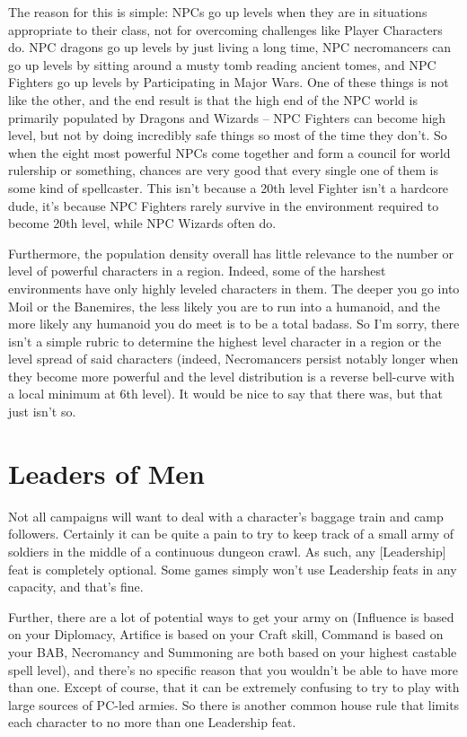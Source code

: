 The reason for this is simple: NPCs go up levels when they are in situations appropriate to their class, not for overcoming challenges like Player Characters do. NPC dragons go up levels by just living a long time, NPC necromancers can go up levels by sitting around a musty tomb reading ancient tomes, and NPC Fighters go up levels by Participating in Major Wars. One of these things is not like the other, and the end result is that the high end of the NPC world is primarily populated by Dragons and Wizards -- NPC Fighters can become high level, but not by doing incredibly safe things so most of the time they don't. So when the eight most powerful NPCs come together and form a council for world rulership or something, chances are very good that every single one of them is some kind of spellcaster. This isn't because a 20th level Fighter isn't a hardcore dude, it's because NPC Fighters rarely survive in the environment required to become 20th level, while NPC Wizards often do.

Furthermore, the population density overall has little relevance to the number or level of powerful characters in a region. Indeed, some of the harshest environments have only highly leveled characters in them. The deeper you go into Moil or the Banemires, the less likely you are to run into a humanoid, and the more likely any humanoid you do meet is to be a total badass. So I'm sorry, there isn't a simple rubric to determine the highest level character in a region or the level spread of said characters (indeed, Necromancers persist notably longer when they become more powerful and the level distribution is a reverse bell-curve with a local minimum at 6th level). It would be nice to say that there was, but that just isn't so.

\section{Leaders of Men}
\vspace*{-8pt}

Not all campaigns will want to deal with a character's baggage train and camp followers. Certainly it can be quite a pain to try to keep track of a small army of soldiers in the middle of a continuous dungeon crawl. As such, any [Leadership] feat is completely optional. Some games simply won't use Leadership feats in any capacity, and that's fine.

Further, there are a lot of potential ways to get your army on (Influence is based on your Diplomacy, Artifice is based on your Craft skill, Command is based on your BAB, Necromancy and Summoning are both based on your highest castable spell level), and there's no specific reason that you wouldn't be able to have more than one. Except of course, that it can be extremely confusing to try to play with large sources of PC-led armies. So there is another common house rule that limits each character to no more than one Leadership feat.


